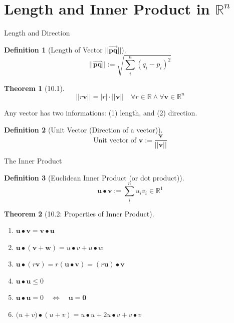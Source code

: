 \documentclass[final]{beamer}
\newtheorem{defn}{Definition}
\newtheorem{thm}{Theorem}
\begin{document}

\section{Length and Inner Product in $\mathbb{R}^n$} %
\label{sec:length_and_inner_product_in_mathbb_r_n}
\begin{frame}[t]{Length and Direction}
	\begin{defn}
		[Length of Vector $||\overrightarrow{\mathbf{pq}}||$]
		\[
			||\mathbf{\overrightarrow{pq}}|| := \sqrt{\sum_i^n (q_i-p_i)^2}
		\]
	\end{defn}
	\begin{thm}
		[10.1]\[
			||r\mathbf{v}||=|r|\cdot||\mathbf{v}|| \quad \forall r\in \mathbb{R}\land \forall\mathbf{v}\in\mathbb{R}^n
		\]
	\end{thm}
	Any vector has two informations: (1) length, and  (2) direction. 
	\begin{defn}
		[Unit Vector (Direction of a vector)]
		\[
		\text{Unit vector of }\mathbf{v}:=\frac{\mathbf{v}}{||\mathbf{v}||}
		\]
	\end{defn}
\end{frame}

\begin{frame}[t]{The Inner Product}
	\begin{defn}
		[Euclidean Inner Product (or dot product)]
		\[
			\mathbf{u}\bullet\mathbf{v}:=\sum_i^n u_iv_i \in \mathbb{R}^1
		\]
	\end{defn}
	\begin{thm}
		[10.2: Properties of Inner Product]\begin{enumerate}
			\item $\mathbf{u\bullet v}=\mathbf{v\bullet u}$
			\item $\mathbf{u\bullet(v+w)}=u\bullet v + u\bullet w$
			\item $\mathbf{u}\bullet(r\mathbf{v})=r(\mathbf{u\bullet v})=(r\mathbf{u})\bullet\mathbf{v}$
			\item $\mathbf{u\bullet u}\le 0$
			\item $\mathbf{u\bullet u}=0\quad\iff\quad \mathbf{u}=\mathbf{0}$ 
			\item $\mathbf(u+v)\bullet(u+v)=u\bullet u + 2 u\bullet v + v\bullet v$
		\end{enumerate}
	\end{thm}
\end{frame}
\end{document}
